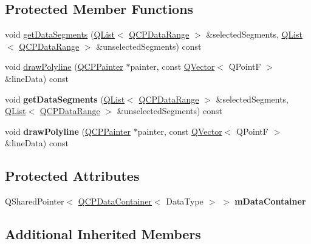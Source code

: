 \subsection*{Protected Member Functions}
\begin{DoxyCompactItemize}
\item 
void \hyperlink{class_q_c_p_abstract_plottable1_d_ae890e62ce403c54f575c73b9529f1af8}{get\+Data\+Segments} (\hyperlink{class_q_list}{Q\+List}$<$ \hyperlink{class_q_c_p_data_range}{Q\+C\+P\+Data\+Range} $>$ \&selected\+Segments, \hyperlink{class_q_list}{Q\+List}$<$ \hyperlink{class_q_c_p_data_range}{Q\+C\+P\+Data\+Range} $>$ \&unselected\+Segments) const
\item 
void \hyperlink{class_q_c_p_abstract_plottable1_d_a7adc6c3cccebb5341f11e0c2b7d54206}{draw\+Polyline} (\hyperlink{class_q_c_p_painter}{Q\+C\+P\+Painter} $\ast$painter, const \hyperlink{class_q_vector}{Q\+Vector}$<$ Q\+PointF $>$ \&line\+Data) const
\item 
\mbox{\label{class_q_c_p_abstract_plottable1_d_ae890e62ce403c54f575c73b9529f1af8}} 
void {\bfseries get\+Data\+Segments} (\hyperlink{class_q_list}{Q\+List}$<$ \hyperlink{class_q_c_p_data_range}{Q\+C\+P\+Data\+Range} $>$ \&selected\+Segments, \hyperlink{class_q_list}{Q\+List}$<$ \hyperlink{class_q_c_p_data_range}{Q\+C\+P\+Data\+Range} $>$ \&unselected\+Segments) const
\item 
\mbox{\label{class_q_c_p_abstract_plottable1_d_a7adc6c3cccebb5341f11e0c2b7d54206}} 
void {\bfseries draw\+Polyline} (\hyperlink{class_q_c_p_painter}{Q\+C\+P\+Painter} $\ast$painter, const \hyperlink{class_q_vector}{Q\+Vector}$<$ Q\+PointF $>$ \&line\+Data) const
\end{DoxyCompactItemize}
\subsection*{Protected Attributes}
\begin{DoxyCompactItemize}
\item 
\mbox{\label{class_q_c_p_abstract_plottable1_d_a89a06f41fc3118e9986a6ec698e6dc95}} 
Q\+Shared\+Pointer$<$ \hyperlink{class_q_c_p_data_container}{Q\+C\+P\+Data\+Container}$<$ Data\+Type $>$ $>$ {\bfseries m\+Data\+Container}
\end{DoxyCompactItemize}
\subsection*{Additional Inherited Members}


